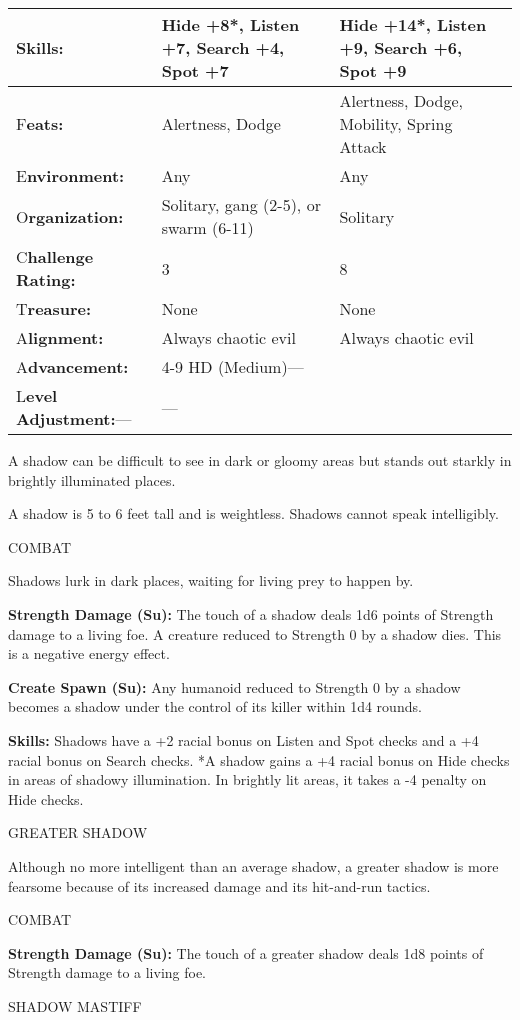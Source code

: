 \documentclass{article}
\begin{document}
\begin{tabular}{|>{\raggedright}p{47pt}|>{\raggedright}p{135pt}|>{\raggedright}p{132pt}|}
\hline
S\textbf{kills:} & Hide +8*, Listen +7, Search +4, Spot +7  & Hide +14*, Listen 
+9, Search +6, Spot +9\tabularnewline
\hline
F\textbf{eats:} & Alertness, Dodge  & Alertness, Dodge, Mobility, Spring Attack\tabularnewline
\hline
E\textbf{nvironment:} & Any  & Any\tabularnewline
\hline
O\textbf{rganization:} & Solitary, gang (2-5), or swarm (6-11)  & Solitary\tabularnewline
\hline
C{\small{}\textbf{hallenge Rating:}} & 3 & 8\tabularnewline
\hline
T\textbf{reasure:} & None  & None\tabularnewline
\hline
A\textbf{lignment:} & Always chaotic evil  & Always chaotic evil\tabularnewline
\hline
A\textbf{dvancement:} & 4-9 HD (Medium)--- & \tabularnewline
\hline
L\textbf{evel Adjustment:}--- & --- & \tabularnewline
\hline
\end{tabular}

\vspace{12pt}
A shadow can be difficult to see in dark or gloomy areas but stands out starkly 
in brightly illuminated places.

A shadow is 5 to 6 feet tall and is weightless. Shadows cannot speak intelligibly.

COMBAT

Shadows lurk in dark places, waiting for living prey to happen by.

\textbf{Strength Damage (Su):} The touch of a shadow deals 1d6 points of Strength 
damage to a living foe. A creature reduced to Strength 0 by a shadow dies. This 
is a negative energy effect.

\textbf{Create Spawn (Su):} Any humanoid reduced to Strength 0 by a shadow becomes 
a shadow under the control of its killer within 1d4 rounds.

\textbf{Skills:} Shadows have a +2 racial bonus on Listen and Spot checks and a 
+4 racial bonus on Search checks. *A shadow gains a +4 racial bonus on Hide checks 
in areas of shadowy illumination. In brightly lit areas, it takes a -4 penalty 
on Hide checks.

\vspace{12pt}
GREATER SHADOW

Although no more intelligent than an average shadow, a greater shadow is more fearsome 
because of its increased damage and its hit-and-run tactics.

COMBAT

\textbf{Strength Damage (Su):} The touch of a greater shadow deals 1d8 points of 
Strength damage to a living foe.

\vspace{12pt}
{\LARGE{}SHADOW MASTIFF}
\end{document}

